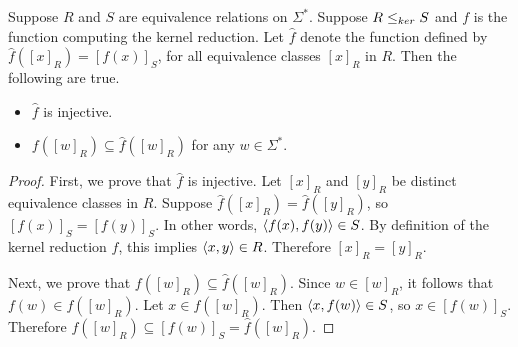 \begin{lemma}\label{lem:image}
  Suppose $R$ and $S$ are equivalence relations on $\Sigma^*$.
  Suppose $R \leq_{ker} S$ and $f$ is the function computing the kernel reduction.
  Let $\hat{f}$ denote the function defined by $\hat{f}([x]_R) = [f(x)]_S$, for all equivalence classes $[x]_R$ in $R$.
  Then the following are true.
  \begin{itemize}
  \item $\hat{f}$ is injective.
  \item $f([w]_R) \subseteq \hat{f}([w]_R)$ for any $w \in \Sigma^*$.
  \end{itemize}
\end{lemma}
\begin{proof}
  First, we prove that $\hat{f}$ is injective.
  Let $[x]_R$ and $[y]_R$ be distinct equivalence classes in $R$.
  Suppose $\hat{f}([x]_R) = \hat{f}([y]_R)$, so $[f(x)]_S = [f(y)]_S$.
  In other words, $\left\langle f(x),f(y)\right\rangle \in S$.
  By definition of the kernel reduction $f$, this implies $\left\langle x,y\right\rangle \in R$.
  Therefore $[x]_R = [y]_R$.

  Next, we prove that $f([w]_R) \subseteq \hat{f}([w]_R)$.
  Since $w \in [w]_R$, it follows that $f(w) \in f([w]_R)$.
  Let $x \in f([w]_R)$.
  Then $\left\langle x,f(w)\right\rangle \in S$, so $x \in [f(w)]_S$.
  Therefore $f([w]_R) \subseteq [f(w)]_S = \hat{f}([w]_R)$.
\end{proof}

